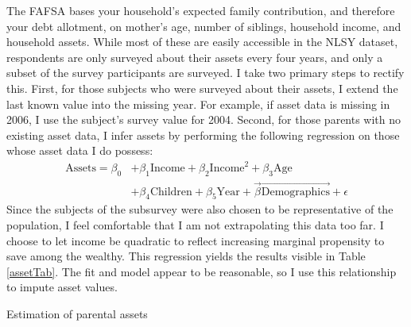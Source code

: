 \documentclass[12pt]{article}
\begin{document}
	The FAFSA bases your household's expected family contribution, and therefore your debt allotment, on mother's age, number of siblings, household income, and household assets. While most of these are easily accessible in the NLSY dataset, respondents are only surveyed about their assets every four years, and only a subset of the survey participants are surveyed. I take two primary steps to rectify this. First, for those subjects who were surveyed about their assets, I extend the last known value into the missing year. For example, if asset data is missing in 2006, I use the subject's survey value for 2004. Second, for those parents with no existing asset data, I infer assets by performing the following regression on those whose asset data I do possess: 
	\begin{equation}
	\begin{aligned}
	\mbox{Assets} = \beta_0 &+ \beta_1 \mbox{Income} + \beta_2 \mbox{Income}^2 + \beta_3 \mbox{Age} \\
	&+ \beta_4 \mbox{Children} + \beta_5 \mbox{Year} + \vec{\beta} \vec{\mbox{Demographics}} + \epsilon
	\end{aligned}
	\end{equation}
	Since the subjects of the subsurvey were also chosen to be representative of the population, I feel comfortable that I am not extrapolating this data too far. I choose to let income be quadratic to reflect increasing marginal propensity to save among the wealthy. This regression yields the results visible in Table \ref{assetTab}. The fit and model appear to be reasonable, so I use this relationship to impute asset values.
	
	\begin{table}
		\centering
		\caption{Estimation of parental assets}
		
		\label{assetTab}
	\end{table}
\end{document}
